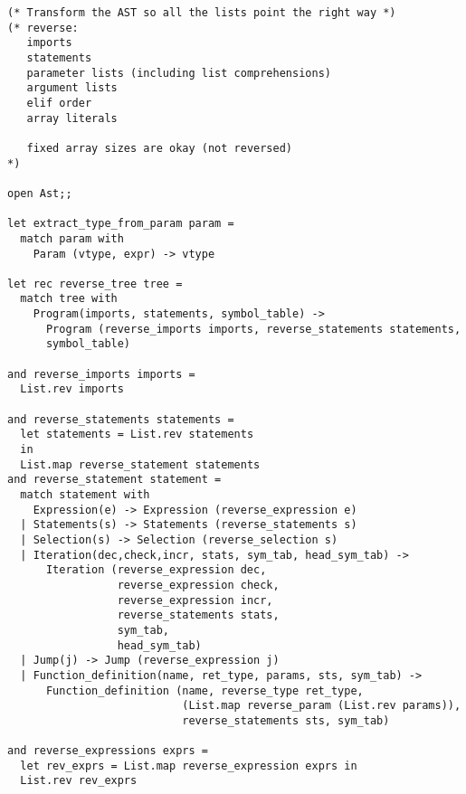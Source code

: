 \begin{verbatim}
(* Transform the AST so all the lists point the right way *)
(* reverse:
   imports
   statements
   parameter lists (including list comprehensions)
   argument lists
   elif order
   array literals

   fixed array sizes are okay (not reversed)
*)

open Ast;;

let extract_type_from_param param =
  match param with
    Param (vtype, expr) -> vtype

let rec reverse_tree tree =
  match tree with
    Program(imports, statements, symbol_table) ->
      Program (reverse_imports imports, reverse_statements statements,
      symbol_table)

and reverse_imports imports =
  List.rev imports

and reverse_statements statements =
  let statements = List.rev statements
  in
  List.map reverse_statement statements
and reverse_statement statement =
  match statement with
    Expression(e) -> Expression (reverse_expression e)
  | Statements(s) -> Statements (reverse_statements s)
  | Selection(s) -> Selection (reverse_selection s)
  | Iteration(dec,check,incr, stats, sym_tab, head_sym_tab) ->
      Iteration (reverse_expression dec,
                 reverse_expression check,
                 reverse_expression incr,
                 reverse_statements stats,
                 sym_tab,
                 head_sym_tab)
  | Jump(j) -> Jump (reverse_expression j)
  | Function_definition(name, ret_type, params, sts, sym_tab) ->
      Function_definition (name, reverse_type ret_type,
                           (List.map reverse_param (List.rev params)),
                           reverse_statements sts, sym_tab)

and reverse_expressions exprs =
  let rev_exprs = List.map reverse_expression exprs in
  List.rev rev_exprs


\end{verbatim}
